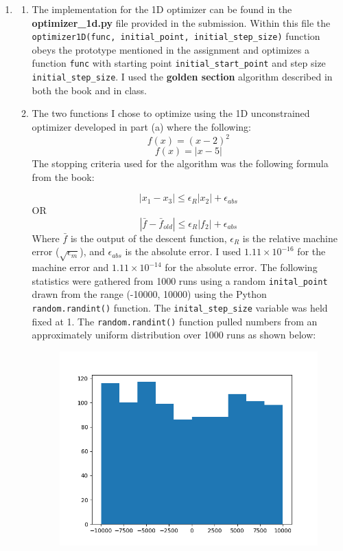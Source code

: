 \documentclass[11pt]{article}
\begin{document}
\begin{enumerate}
\item
\begin{enumerate}
\item The implementation for the 1D optimizer can be found in the {\bf optimizer\_1d.py} file provided in the submission. Within this file the \texttt{optimizer1D(func, initial\_point, initial\_step\_size)} function obeys the prototype mentioned in the assignment and optimizes a function \texttt{func} with starting point \texttt{initial\_start\_point} and step size \texttt{initial\_step\_size}. I used the {\bf golden section} algorithm described in both the book and in class.
\item The two functions I chose to optimize using the 1D unconstrained optimizer developed in part (a) where the following:
\[f(x) = (x - 2)^2 \]
\[f(x) = |x - 5|\]
The stopping criteria used for the algorithm was the following formula from the book:

$$  |x_{1} - x_{3}| \le \epsilon_{R}|x_{2}| + \epsilon_{abs} $$
\centering
OR
$$ |\bar{f} - \bar{f}_{old} | \le \epsilon_{R} |f_{2}| + \epsilon_{abs} $$
\flushleft
Where $\bar{f}$ is the output of the descent function, $\epsilon_{R}$ is the relative machine error ($\sqrt{\epsilon_{m}}$), and $\epsilon_{abs}$ is the absolute error. I used $1.11 \times 10^{-16}$ for the machine error and $1.11 \times 10^{-14}$ for the absolute error.
The following statistics were gathered from 1000 runs using a random \texttt{inital\_point} drawn from the range (-10000, 10000) using the Python \texttt{random.randint()} function. The \texttt{inital\_step\_size} variable was held fixed at 1. The \texttt{random.randint()} function pulled numbers from an approximately uniform distribution over 1000 runs as shown below: \\
\begin{figure}[h]

	\centering
	\includegraphics[width=10cm]{report_images/start_point}
	\label{fig:rand_distribution}
	

\end{figure}
\end{enumerate}
\end{enumerate}
\end{document}
